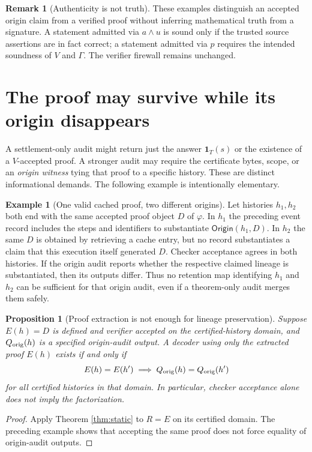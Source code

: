 \documentclass[11pt,letterpaper]{article}
\newtheorem{proposition}[theorem]{Proposition}
\theoremstyle{definition}
\newtheorem{example}[theorem]{Example}
\newtheorem{remark}[theorem]{Remark}
\begin{document}
\begin{remark}[Authenticity is not truth]
These examples distinguish an accepted origin claim from a verified proof without inferring mathematical truth from a signature. A statement admitted via $a\land u$ is sound only if the trusted source assertions are in fact correct; a statement admitted via $p$ requires the intended soundness of $V$ and $\Gamma$. The verifier firewall remains unchanged.
\end{remark}


\section{The proof may survive while its origin disappears}\label{sec:proof-origin}
A settlement-only audit might return just the answer $\mathbf 1_{T}(s)$ or the existence of a $V$-accepted proof. A stronger audit may require the certificate bytes, scope, or an \emph{origin witness} tying that proof to a specific history. These are distinct informational demands. The following example is intentionally elementary.

\begin{example}[One valid cached proof, two different origins]
Let histories $h_1,h_2$ both end with the same accepted proof object $D$ of $\varphi$. In $h_1$ the preceding event record includes the steps and identifiers to substantiate $\mathsf{Origin}(h_1,D)$. In $h_2$ the same $D$ is obtained by retrieving a cache entry, but no record substantiates a claim that this execution itself generated $D$. Checker acceptance agrees in both histories. If the origin audit reports whether the respective claimed lineage is substantiated, then its outputs differ. Thus no retention map identifying $h_1$ and $h_2$ can be sufficient for that origin audit, even if a theorem-only audit merges them safely.
\end{example}

\begin{proposition}[Proof extraction is not enough for lineage preservation]\label{prop:origin-factor}
Suppose $E(h)=D$ is defined and verifier accepted on the certified-history domain, and $Q_{\rm orig}(h)$ is a specified origin-audit output. A decoder using \emph{only} the extracted proof $E(h)$ exists if and only if
\[
E(h)=E(h')\implies Q_{\rm orig}(h)=Q_{\rm orig}(h')
\]
for all certified histories in that domain. In particular, checker acceptance alone does not imply the factorization.
\end{proposition}
\begin{proof}
Apply Theorem \ref{thm:static} to $R=E$ on its certified domain. The preceding example shows that accepting the same proof does not force equality of origin-audit outputs.
\end{proof}
\end{document}
